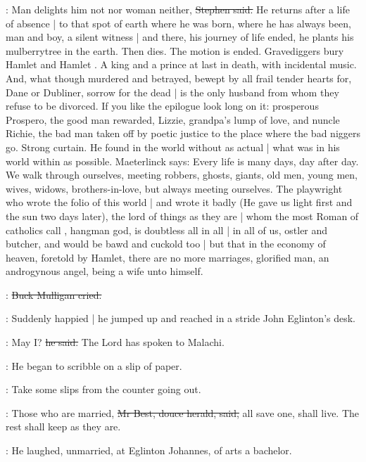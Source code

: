 \Stephen:
Man delights him not nor woman neither,
\sout{Stephen said.}
He returns after a life of absence |
to that spot of earth where he was born,
where he has always been,
man and boy,
a silent witness |
and there,
his journey of life ended,
he plants his mulberrytree in the earth.
Then dies.
The motion is ended.
Gravediggers bury Hamlet  and Hamlet .
A king and a prince at last in death,
with incidental music.
And, what though murdered and betrayed,
bewept by all frail tender hearts for,
Dane or Dubliner,
sorrow for the dead |
is the only husband from whom they refuse to be divorced.
If you like the epilogue look long on it:
prosperous Prospero,
the good man rewarded,
Lizzie, grandpa's lump of love,
and nuncle Richie,
the bad man taken off by poetic justice
to the place where the bad niggers go.
Strong curtain.
He found in the world without as actual |
what was in his world within as possible.
Maeterlinck says:
Every life is many days,
day after day.
We walk through ourselves,
meeting robbers, ghosts, giants,
old men, young men,
wives, widows,
brothers-in-love,
but always meeting ourselves.
The playwright who wrote the folio of this world |
and wrote it badly
(He gave us light first and the sun two days later),
the lord of things as they are |
whom the most Roman of catholics call ,
hangman god,
is doubtless all in all |
in all of us,
ostler and butcher,
and would be bawd and cuckold too |
but that in the economy of heaven,
foretold by Hamlet,
there are no more marriages,
glorified man,
an androgynous angel,
being a wife unto himself.

\mulligan:
\sout{Buck Mulligan cried.}

:
Suddenly happied |
he jumped up and reached in a stride John Eglinton's desk.

\mulligan:
May I?
\sout{he said.}
The Lord has spoken to Malachi.

:
He began to scribble on a slip of paper.

\StephenInt:
Take some slips from the counter going out.

\best:
Those who are married,
\sout{Mr Best, douce herald, said,}
all save one,
shall live.
The rest shall keep as they are.

:
He laughed,
unmarried,
at Eglinton Johannes,
of arts a bachelor.

